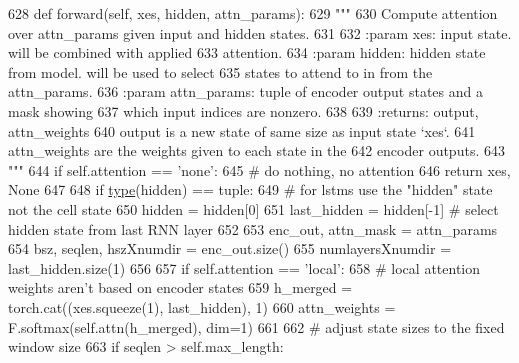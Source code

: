 \begin{DoxyCode}
628     \textcolor{keyword}{def }forward(self, xes, hidden, attn\_params):
629         \textcolor{stringliteral}{"""}
630 \textcolor{stringliteral}{        Compute attention over attn\_params given input and hidden states.}
631 \textcolor{stringliteral}{}
632 \textcolor{stringliteral}{        :param xes:         input state. will be combined with applied}
633 \textcolor{stringliteral}{                            attention.}
634 \textcolor{stringliteral}{        :param hidden:      hidden state from model. will be used to select}
635 \textcolor{stringliteral}{                            states to attend to in from the attn\_params.}
636 \textcolor{stringliteral}{        :param attn\_params: tuple of encoder output states and a mask showing}
637 \textcolor{stringliteral}{                            which input indices are nonzero.}
638 \textcolor{stringliteral}{}
639 \textcolor{stringliteral}{        :returns: output, attn\_weights}
640 \textcolor{stringliteral}{                  output is a new state of same size as input state `xes`.}
641 \textcolor{stringliteral}{                  attn\_weights are the weights given to each state in the}
642 \textcolor{stringliteral}{                  encoder outputs.}
643 \textcolor{stringliteral}{        """}
644         \textcolor{keywordflow}{if} self.attention == \textcolor{stringliteral}{'none'}:
645             \textcolor{comment}{# do nothing, no attention}
646             \textcolor{keywordflow}{return} xes, \textcolor{keywordtype}{None}
647 
648         \textcolor{keywordflow}{if} \hyperlink{namespaceparlai_1_1agents_1_1tfidf__retriever_1_1build__tfidf_ad5dfae268e23f506da084a9efb72f619}{type}(hidden) == tuple:
649             \textcolor{comment}{# for lstms use the "hidden" state not the cell state}
650             hidden = hidden[0]
651         last\_hidden = hidden[-1]  \textcolor{comment}{# select hidden state from last RNN layer}
652 
653         enc\_out, attn\_mask = attn\_params
654         bsz, seqlen, hszXnumdir = enc\_out.size()
655         numlayersXnumdir = last\_hidden.size(1)
656 
657         \textcolor{keywordflow}{if} self.attention == \textcolor{stringliteral}{'local'}:
658             \textcolor{comment}{# local attention weights aren't based on encoder states}
659             h\_merged = torch.cat((xes.squeeze(1), last\_hidden), 1)
660             attn\_weights = F.softmax(self.attn(h\_merged), dim=1)
661 
662             \textcolor{comment}{# adjust state sizes to the fixed window size}
663             \textcolor{keywordflow}{if} seqlen > self.max\_length:

\end{DoxyCode}
